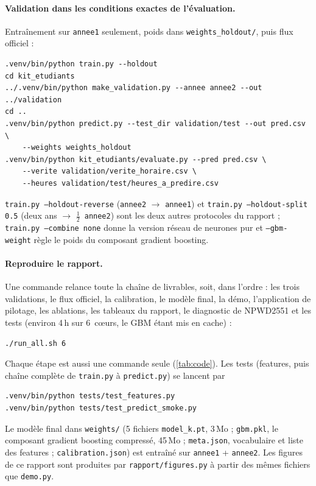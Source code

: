 \documentclass[11pt,a4paper]{article}
\begin{document}
\paragraph{Validation dans les conditions exactes de l'évaluation.} Entraînement sur \texttt{annee1} seulement, poids dans \texttt{weights\_holdout/}, puis flux officiel :
{\small
\begin{verbatim}
.venv/bin/python train.py --holdout
cd kit_etudiants
../.venv/bin/python make_validation.py --annee annee2 --out ../validation
cd ..
.venv/bin/python predict.py --test_dir validation/test --out pred.csv \
    --weights weights_holdout
.venv/bin/python kit_etudiants/evaluate.py --pred pred.csv \
    --verite validation/verite_horaire.csv \
    --heures validation/test/heures_a_predire.csv
\end{verbatim}
}
\texttt{train.py --holdout-reverse} (\texttt{annee2} $\rightarrow$ \texttt{annee1}) et \texttt{train.py --holdout-split 0.5} (deux ans $\rightarrow$ $\tfrac{1}{2}$~\texttt{annee2}) sont les deux autres protocoles du rapport ; \texttt{train.py --combine none} donne la version réseau de neurones pur et \texttt{--gbm-weight} règle le poids du composant gradient boosting.

\paragraph{Reproduire le rapport.} Une commande relance toute la chaîne de livrables, soit, dans l'ordre : les trois validations, le flux officiel, la calibration, le modèle final, la démo, l'application de pilotage, les ablations, les tableaux du rapport, le diagnostic de NPWD2551 et les tests (environ 4\,h sur 6~cœurs, le GBM étant mis en cache) :
{\small
\begin{verbatim}
./run_all.sh 6
\end{verbatim}
}
Chaque étape est aussi une commande seule (\autoref{tab:code}). Les tests (features, puis chaîne complète de \texttt{train.py} à \texttt{predict.py}) se lancent par
{\small
\begin{verbatim}
.venv/bin/python tests/test_features.py
.venv/bin/python tests/test_predict_smoke.py
\end{verbatim}
}
Le modèle final dans \texttt{weights/} (5 fichiers \texttt{model\_k.pt}, 3\,Mo ; \texttt{gbm.pkl}, le composant gradient boosting compressé, 45\,Mo ; \texttt{meta.json}, vocabulaire et liste des features ; \texttt{calibration.json}) est entraîné sur \texttt{annee1} + \texttt{annee2}. Les figures de ce rapport sont produites par \texttt{rapport/figures.py} à partir des mêmes fichiers que \texttt{demo.py}.
\end{document}

